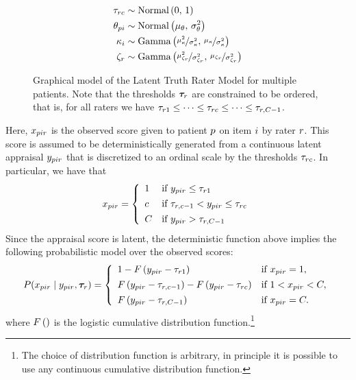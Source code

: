 \documentclass[a4paper,11pt]{article}
\begin{document}
\begin{figure}[!ht]
\begin{minipage}{0.45\textwidth}
{\begin{align*}
			\tau_{rc} &\sim \text{Normal}\left(0,\,1\right)\\
			\theta_{pi}        &\sim \text{Normal}\left(\mu_\theta,\,\sigma_\theta^2\right)\\
			\kappa_i   &\sim \text{Gamma}\left(\nicefrac{\mu_\kappa^2}{\sigma_\kappa^2},\,\nicefrac{\mu_\kappa}{\sigma_\kappa^2}\right) \\
			\zeta_r &\sim \text{Gamma}\left(\nicefrac{\mu_{\zeta_r}^2}{\sigma_{\zeta_r}^2},\,\nicefrac{\mu_{\zeta_r}}{\sigma_{\zeta_r}^2}\right) \\
			\end{align*}
		}%
	\end{minipage}
	\caption{%
		Graphical model of the Latent Truth Rater Model for multiple patients.
		Note that the thresholds $\bm{\tau}_r$ are constrained to be ordered, that is, for all raters we have $\Threshold_{\Irater 1} \leq \dots \leq \Threshold_{\Irater \Incat} \leq \dots \leq \Threshold_{\Irater,\Tncat-1}$.
	}
	\label{model:LTM_p}
\end{figure}

Here, $x_{pir}$ is the observed score given to patient $p$ on item $i$ by rater $r$.
This score is assumed to be deterministically generated from a continuous latent appraisal $y_{pir}$ that is discretized to an ordinal scale by the thresholds $\tau_{rc}$.
In particular, we have that
\begin{align*}
\oneScore =
\left\{\begin{array}{ll}
1		& \text{if }  \Appraisal_{\Ipatient\Iitem\Irater} \leq \Threshold_{\Irater 1} \\[4pt]
\Incat	& \text{if }  \Threshold_{\Irater, \Incat - 1} < \Appraisal_{\Ipatient\Iitem\Irater} \leq \Threshold_{\Irater\Incat} \\[4pt]
\Tncat	& \text{if }  \Appraisal_{\Ipatient\Iitem\Irater} > \Threshold_{\Irater,\Tncat-1}
\end{array} \right.
\end{align*}
Since the appraisal score is latent, the deterministic function above implies the following probabilistic model over the observed scores:
\begin{align*}
P(\oneScore\mid \oneAppraisal,\bm{\Threshold}_{\Irater}) =
\left\{\begin{array}{ll}
1 - \cdf{\Appraisal_{\Ipatient\Iitem\Irater} - \Threshold_{\Irater 1}}         & \text{if } \oneScore = 1, \\[4pt]
\cdf{\oneAppraisal - \Threshold_{\Irater,\Incat-1}} -
\cdf{\oneAppraisal - \Threshold_{\Irater\Incat}}         & \text{if } 1 < \oneScore < \Tncat,\\[4pt]
\cdf{\oneAppraisal - \Threshold_{\Irater,\Tncat-1}}       & \text{if } \oneScore = \Tncat.
\end{array} \right.
\end{align*}
where $F\left(\right)$ is the logistic cumulative distribution function.\footnote{%
	The choice of distribution function is arbitrary, in principle it is possible to use any continuous cumulative distribution function.
}
\end{document}
